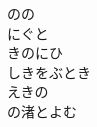 \documentclass[10pt,b5j]{tarticle} %
\begin{document}
\begin{enumerate}
\begin{minipage}[c]{\blocksize}
        \vspace{\linespace}
        \item
        のの\\
        にぐと\\
        きのにひ\\
        しきをぶとき\\
        えきの\\
        の渚とよむ
    
    \end{minipage}
\end{enumerate} %
\end{document}
